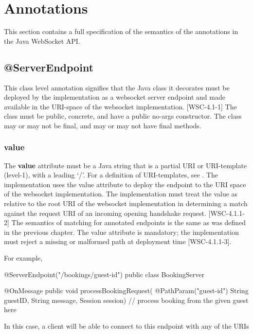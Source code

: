\chapter{Annotations}
\label{annotations}

This section contains a full specification of the semantics of the annotations in the Java WebSocket API.

\section{@ServerEndpoint}

This class level annotation signifies that the Java class it decorates must be deployed by the implementation as a websocket server endpoint and made available in the URI-space of the websocket implementation. [WSC-4.1-1] The class must be public, concrete, and have a public no-args constructor. The class may or may not be final, and may or may not have final methods.

\subsection{value}

The \textbf{value} attribute must be a Java string that is a partial URI or URI-template (level-1), with a leading `/'. For a definition of URI-templates, see \cite{rfc6570}. The implementation uses the value attribute to deploy the endpoint to the URI space of the websocket implementation. The implementation must treat the value as relative to the root URI of the websocket implementation in determining a match against the request URI of an incoming opening handshake request. [WSC-4.1.1-2] The semantics of matching for annotated endpoints is the same as was defined in the previous chapter. The value attribute is mandatory; the implementation must reject a missing or malformed path at deployment time [WSC-4.1.1-3].

For example,

\begin{listing}{1}
@ServerEndpoint("/bookings/{guest-id}")
public class BookingServer {

    @OnMessage
    public void processBookingRequest(
            @PathParam("guest-id") String guestID,
            String message,
            Session session) {
        // process booking from the given guest here
    }
}
\end{listing}

In this case, a client will be able to connect to this endpoint with any of the URIs

